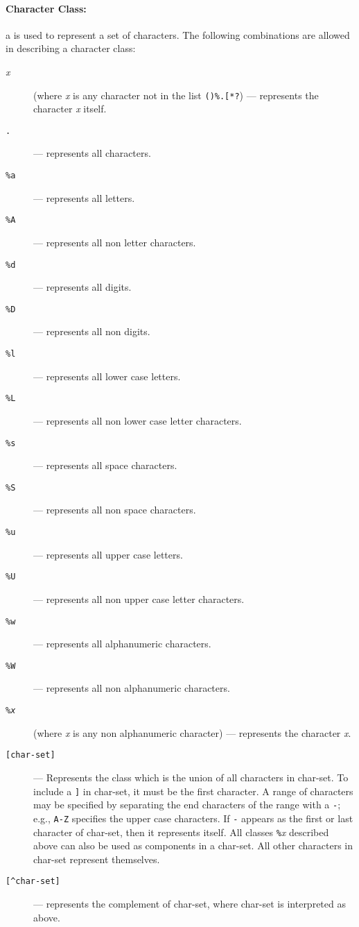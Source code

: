 \paragraph{Character Class:}
a  is used to represent a set of characters.
The following combinations are allowed in describing a character class:
\begin{description}
\item[{\em x}] (where {\em x} is any character not in the list \verb'()%.[*?')
--- represents the character {\em x} itself.
\item[{\tt .}] --- represents all characters.
\item[{\tt \%a}] --- represents all letters.
\item[{\tt \%A}] --- represents all non letter characters.
\item[{\tt \%d}] --- represents all digits.
\item[{\tt \%D}] --- represents all non digits.
\item[{\tt \%l}] --- represents all lower case letters.
\item[{\tt \%L}] --- represents all non lower case letter characters.
\item[{\tt \%s}] --- represents all space characters.
\item[{\tt \%S}] --- represents all non space characters.
\item[{\tt \%u}] --- represents all upper case letters.
\item[{\tt \%U}] --- represents all non upper case letter characters.
\item[{\tt \%w}] --- represents all alphanumeric characters.
\item[{\tt \%W}] --- represents all non alphanumeric characters.
\item[{\tt \%\em x}] (where {\em x} is any non alphanumeric character)  ---
represents the character {\em x}.
\item[{\tt [char-set]}] --- 
Represents the class which is the union of all
characters in char-set.
To include a \verb']' in char-set, it must be the first character.
A range of characters may be specified by
separating the end characters of the range with a \verb'-';
e.g., \verb'A-Z' specifies the upper case characters.
If \verb'-' appears as the first or last character of char-set,
then it represents itself.
All classes \verb'%'{\em x} described above can also be used as
components in a char-set.
All other characters in char-set represent themselves.
\item[{\tt [\^{ }char-set]}] ---
represents the complement of char-set,
where char-set is interpreted as above.
\end{description}

